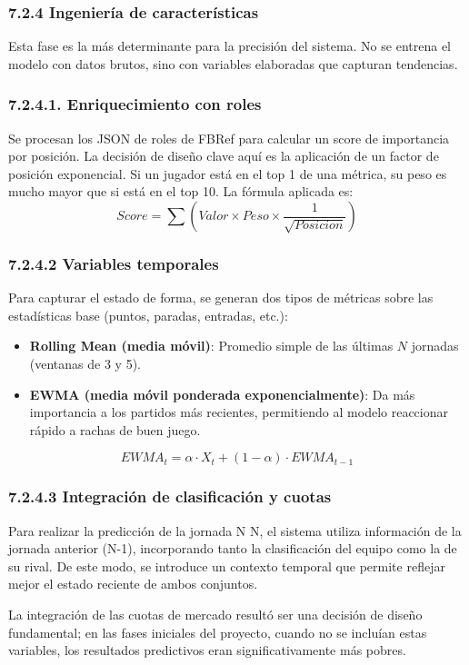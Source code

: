 \subsubsection{7.2.4 Ingeniería de características}
Esta fase es la más determinante para la precisión del sistema. No se entrena el
modelo con datos brutos, sino con variables elaboradas que capturan tendencias.

\subsubsection{7.2.4.1. Enriquecimiento con roles}
Se procesan los JSON de roles de FBRef para calcular un score de importancia por
posición. La decisión de diseño clave aquí es la aplicación de un factor de
posición exponencial. Si un jugador está en el top 1 de una métrica, su peso es
mucho mayor que si está en el top 10. La fórmula aplicada es:
$$Score = \sum (Valor \times Peso \times \frac{1}{\sqrt{Posicion}})$$


\subsubsection{7.2.4.2 Variables temporales}
Para capturar el estado de forma, se generan dos tipos de métricas sobre las
estadísticas base (puntos, paradas, entradas, etc.):

\begin{itemize}
\item \textbf{Rolling Mean (media móvil)}: Promedio simple de las últimas $N$
jornadas (ventanas de 3 y 5).
\item \textbf{EWMA (media móvil ponderada exponencialmente)}: Da más importancia
a los partidos más recientes, permitiendo al modelo reaccionar rápido a rachas
de buen juego.
\end{itemize}
$$EWMA_t = \alpha \cdot X_t + (1-\alpha) \cdot EWMA_{t-1}$$

\subsubsection{7.2.4.3 Integración de clasificación y cuotas}
Para realizar la predicción de la jornada N
N, el sistema utiliza información de la jornada anterior (N-1), incorporando tanto la 
clasificación del equipo como la de su rival. De este modo, se introduce un contexto 
temporal que permite reflejar mejor el estado reciente de ambos conjuntos.

La integración de las cuotas de mercado resultó ser una decisión de diseño fundamental; 
en las fases iniciales del proyecto, cuando no se incluían estas variables, los resultados
 predictivos eran significativamente más pobres.
 
